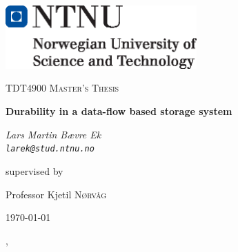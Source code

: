 \documentclass[b5paper]{report}
\begin{document}
\begin{titlepage}
  \centering
	\includegraphics[width=0.55\textwidth]{ntnu}\par\vspace{1cm}
	{\scshape\Large TDT4900 Master's Thesis \par}
	\vspace{1.5cm}
	{\huge\bfseries Durability in a data-flow based storage system\par}
	\vspace{2cm}
	{\Large\itshape Lars Martin Bævre Ek \\ \texttt{larek@stud.ntnu.no} \par}
	\vfill
	supervised by\par
  Professor Kjetil \textsc{Nørvåg}

	{\large \today\par}
\end{titlepage}



\tableofcontents
\pagebreak

\begin{abstract}
  
\end{abstract}

\ChTitleVar{\Huge\bfseries\rm}, \ChRuleWidth{1pt}











\appendix


\printbibliography
\end{document}
